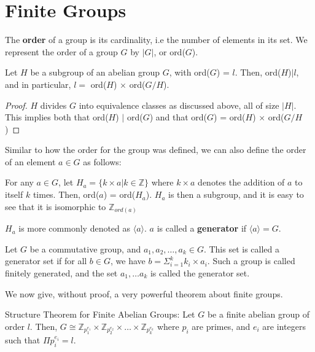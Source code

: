 \section{Finite Groups}
The \textbf{order} of a group is its cardinality, i.e the number of elements in its set.
We represent the order of a group $G$ by $|G|$, or ord($G$).
\begin{theorem} \label{th:order}
  Let $H$ be a subgroup of an abelian group $G$, with ord($G$) = $l$.
  Then, ord($H$)$| l$, and in particular, $l = $ ord($H$) $\times$ ord($ G \big/ H $).
\end{theorem}
\begin{proof}
  $H$ divides $G$ into equivalence classes as discussed above, all of size $|H|$.
  This implies both that ord($H$) $|$ ord($G$) and that ord($G$) =  ord($H$) $\times$ ord($ G \big/ H $)
\end{proof}
Similar to how the order for the group was defined, we can also define the order of an element $a \in G$ as follows:
\par
For any $a \in G$, let $H_{a} = \{ k \times a | k \in \mathbb{Z} \}$ where $k \times a$ denotes the addition of $a$ to itself $k$ times.
Then, ord($a$) = ord($H_{a}$).
$H_{a}$ is then a subgroup, and it is easy to see that it is isomorphic to $\mathbb{Z}_{ord(a)}$
\par
$H_{a}$ is more commonly denoted as $\langle a \rangle$.
$a$ is called a \textbf{generator} if $\langle a \rangle = G$.
\begin{definition} \label{def:finitegen}
  Let $G$ be a commutative group, and $a_{1}, a_{2}, \dots, a_{k} \in G$.
  This set is called a generator set if for all $b \in G$, we have $b = \Sigma_{i=1}^{k} k_{i} \times a_{i}$.
  Such a group is called finitely generated, and the set $a_{1}, \dots a_{k}$ is called the generator set.
\end{definition}
We now give, without proof, a very powerful theorem about finite groups.
\begin{theorem} \label{th:structurefinite}
  Structure Theorem for Finite Abelian Groups: Let $G$ be a finite abelian group of order $l$.
  Then, $G \cong \mathbb{Z}_{p_{1}^{e_{1}}} \times \mathbb{Z}_{p_{2}^{e_{2}}} \times \dots  \times \mathbb{Z}_{p_{k}^{e_{k}}}$ where $p_{i}$ are primes, and $e_{i}$ are integers such that $\Pi p_{i}^{e_{i}} = l$.
\end{theorem}
